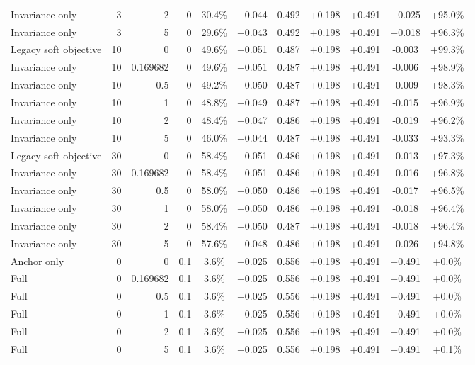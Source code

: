 \begin{table}[htbp]
\begin{tabular}{lrrrccccccc}
Invariance only & 3 & 2 & 0 & 30.4\% & +0.044 & 0.492 & +0.198 & +0.491 & +0.025 & +95.0\% \\
Invariance only & 3 & 5 & 0 & 29.6\% & +0.043 & 0.492 & +0.198 & +0.491 & +0.018 & +96.3\% \\
Legacy soft objective & 10 & 0 & 0 & 49.6\% & +0.051 & 0.487 & +0.198 & +0.491 & -0.003 & +99.3\% \\
Invariance only & 10 & 0.169682 & 0 & 49.6\% & +0.051 & 0.487 & +0.198 & +0.491 & -0.006 & +98.9\% \\
Invariance only & 10 & 0.5 & 0 & 49.2\% & +0.050 & 0.487 & +0.198 & +0.491 & -0.009 & +98.3\% \\
Invariance only & 10 & 1 & 0 & 48.8\% & +0.049 & 0.487 & +0.198 & +0.491 & -0.015 & +96.9\% \\
Invariance only & 10 & 2 & 0 & 48.4\% & +0.047 & 0.486 & +0.198 & +0.491 & -0.019 & +96.2\% \\
Invariance only & 10 & 5 & 0 & 46.0\% & +0.044 & 0.487 & +0.198 & +0.491 & -0.033 & +93.3\% \\
Legacy soft objective & 30 & 0 & 0 & 58.4\% & +0.051 & 0.486 & +0.198 & +0.491 & -0.013 & +97.3\% \\
Invariance only & 30 & 0.169682 & 0 & 58.4\% & +0.051 & 0.486 & +0.198 & +0.491 & -0.016 & +96.8\% \\
Invariance only & 30 & 0.5 & 0 & 58.0\% & +0.050 & 0.486 & +0.198 & +0.491 & -0.017 & +96.5\% \\
Invariance only & 30 & 1 & 0 & 58.0\% & +0.050 & 0.486 & +0.198 & +0.491 & -0.018 & +96.4\% \\
Invariance only & 30 & 2 & 0 & 58.4\% & +0.050 & 0.487 & +0.198 & +0.491 & -0.018 & +96.4\% \\
Invariance only & 30 & 5 & 0 & 57.6\% & +0.048 & 0.486 & +0.198 & +0.491 & -0.026 & +94.8\% \\
Anchor only & 0 & 0 & 0.1 & 3.6\% & +0.025 & 0.556 & +0.198 & +0.491 & +0.491 & +0.0\% \\
Full & 0 & 0.169682 & 0.1 & 3.6\% & +0.025 & 0.556 & +0.198 & +0.491 & +0.491 & +0.0\% \\
Full & 0 & 0.5 & 0.1 & 3.6\% & +0.025 & 0.556 & +0.198 & +0.491 & +0.491 & +0.0\% \\
Full & 0 & 1 & 0.1 & 3.6\% & +0.025 & 0.556 & +0.198 & +0.491 & +0.491 & +0.0\% \\
Full & 0 & 2 & 0.1 & 3.6\% & +0.025 & 0.556 & +0.198 & +0.491 & +0.491 & +0.0\% \\
Full & 0 & 5 & 0.1 & 3.6\% & +0.025 & 0.556 & +0.198 & +0.491 & +0.491 & +0.1\% \\

\end{tabular}
\end{table}
